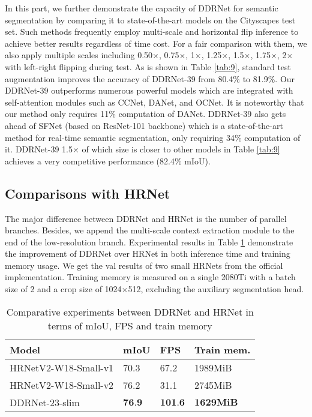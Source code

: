 \documentclass[journal]{IEEEtran}
\begin{document}
In this part, we further demonstrate the capacity of DDRNet for semantic segmentation by comparing it to state-of-the-art models on the Cityscapes test set. Such methods frequently employ multi-scale and horizontal flip inference to achieve better results regardless of time cost. For a fair comparison with them, we also apply multiple scales including 0.50$\times$, 0.75$\times$, 1$\times$, 1.25$\times$, 1.5$\times$, 1.75$\times$, 2$\times$ with left-right flipping during test. As is shown in Table \ref{tab:9}, standard test augmentation improves the accuracy of DDRNet-39 from 80.4$\%$ to 81.9$\%$. Our DDRNet-39 outperforms numerous powerful models which are integrated with self-attention modules such as CCNet, DANet, and OCNet. It is noteworthy that our method only requires 11$\%$ computation of DANet. DDRNet-39 also gets ahead of SFNet (based on ResNet-101 backbone) which is a state-of-the-art method for real-time semantic segmentation, only requiring 34$\%$ computation of it. DDRNet-39 1.5$\times$ of which size is closer to other models in Table \ref{tab:9} achieves a very competitive performance (82.4$\%$ mIoU).

\subsection{Comparisons with HRNet}

The major difference between DDRNet and HRNet is the number of parallel branches. Besides, we append the multi-scale context extraction module to the end of the low-resolution branch. Experimental results in Table \ref{tab:10} demonstrate the improvement of DDRNet over HRNet in both inference time and training memory usage. We get the val results of two small HRNets from the official implementation. Training memory is measured on a single 2080Ti with a batch size of 2 and a crop size of 1024$\times$512, excluding the auxiliary segmentation head.

\begin{table}[]
\caption{Comparative experiments between DDRNet and HRNet in terms of mIoU, FPS and train memory}
\label{tab:10}
\begin{tabular}{p{100pt}p{30pt}<{\centering}p{30pt}<{\centering}p{43pt}<{\centering}}
\toprule
Model                                & mIoU              & FPS               & Train mem.  \\ \midrule
HRNetV2-W18-Small-v1\cite{9052469}   & 70.3              & 67.2              & 1989MiB     \\
HRNetV2-W18-Small-v2\cite{9052469}   & 76.2              & 31.1              & 2745MiB     \\
DDRNet-23-slim                       & $\textbf{76.9}$   & $\textbf{101.6}$  & $\textbf{1629MiB}$     \\ \bottomrule
\end{tabular}
\end{table}
\end{document}
